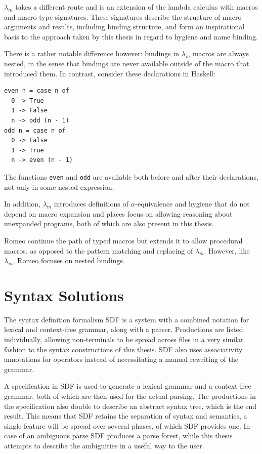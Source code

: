\documentclass{kththesis}
\begin{document}
$\lambda_m$ \cite{Herman2010A-Theory-of-Typ} takes a different route and is an extension of the lambda calculus with macros and macro type signatures. These signatures describe the structure of macro arguments and results, including binding structure, and form an inspirational basis to the approach taken by this thesis in regard to hygiene and name binding.

There is a rather notable difference however: bindings in $\lambda_m$ macros are always nested, in the sense that bindings are never available outside of the macro that introduced them. In contrast, consider these declarations in Haskell:
\begin{verbatim}
even n = case n of
  0 -> True
  1 -> False
  n -> odd (n - 1)
odd n = case n of
  0 -> False
  1 -> True
  n -> even (n - 1)
\end{verbatim}
The functions \texttt{even} and \texttt{odd} are available both before and after their declarations, not only in some nested expression.

In addition, $\lambda_m$ introduces definitions of $\alpha$-equivalence and hygiene that do not depend on macro expansion and places focus on allowing reasoning about unexpanded programs, both of which are also present in this thesis.

Romeo \cite{Stansifer2014Romeo} continue the path of typed macros but extends it to allow procedural macros, as opposed to the pattern matching and replacing of $\lambda_m$. However, like $\lambda_m$, Romeo focuses on nested bindings.

\section{Syntax Solutions} \label{sec:syntax-solutions}

The syntax definition formalism SDF \cite{Heering1989The-syntax-defi} is a system with a combined notation for lexical and context-free grammar, along with a parser. Productions are listed individually, allowing non-terminals to be spread across files in a very similar fashion to the syntax constructions of this thesis. SDF also uses associativity annotations for operators instead of necessitating a manual rewriting of the grammar.

A specification in SDF is used to generate a lexical grammar and a context-free grammar, both of which are then used for the actual parsing. The productions in the specification also double to describe an abstract syntax tree, which is the end result. This means that SDF retains the separation of syntax and semantics, a single feature will be spread over several phases, of which SDF provides one. In case of an ambiguous parse SDF produces a parse forest, while this thesis attempts to describe the ambiguities in a useful way to the user.
\end{document}

